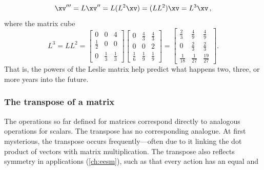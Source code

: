 \begin{example}
\begin{equation*}
\xv'''=L\xv''=L(L^2\xv)=(LL^2)\xv=L^3\xv\,,
\end{equation*}
where the matrix cube
\begin{equation*}
L^3=LL^2=\begin{bmatrix} 0&0&4\\\frac12&0&0\\0&\frac13&\frac13 \end{bmatrix}\begin{bmatrix} 0&\frac43&\frac43\\0&0&2\\\frac16&\frac19&\frac19 \end{bmatrix}
=\begin{bmatrix} \frac23&\frac49&\frac49\\ 0&\frac23&\frac23\\  \frac1{18}&\frac1{27}&\frac{19}{27}\end{bmatrix}.
\end{equation*}
That is, the powers of the Leslie matrix help predict what happens two, three, or more years into the future.
\end{example}






\subsubsection{The transpose of a matrix}


The operations so far defined for matrices correspond directly to analogous operations for scalars.
The transpose has no corresponding analogue.
At first mysterious, the transpose occurs frequently---often due to it linking the dot product of vectors with matrix multiplication.
The transpose also reflects symmetry in applications (\cref{ch:eesm}), such as  that every action has an equal and 

